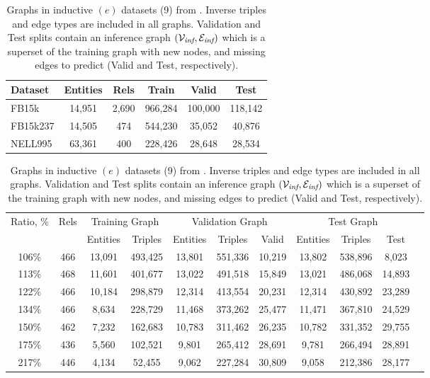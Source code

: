 \begin{table}[!ht]
\centering
\caption{Graph in transductive datasets (3) from \citet{betae}. Inverse triples and edge types are included in the splits. Train, Valid, Test denote triples in the respective set. }
\label{tab:app_datasets_transd}
\begin{tabular}{lccccc}\toprule
Dataset &Entities &Rels &Train &Valid &Test  \\\midrule
FB15k & 14,951 & 2,690 & 966,284 & 100,000 & 118,142 \\
FB15k237 &14,505 &474 &544,230 &35,052 &40,876 \\
NELL995  &63,361 &400 &228,426 &28,648 & 28,534 \\
\bottomrule
\end{tabular}
%
\caption{Graphs in inductive $(e)$ datasets (9) from \citet{galkin2022}. Inverse triples and edge types are included in all graphs. Validation and Test splits contain an inference graph $({\mathcal{V}}_\textit{inf}, {\mathcal{E}}_\textit{inf})$ which is a superset of the training graph with new nodes, and missing edges to predict (Valid and Test, respectively).  }
\label{tab:app_datasets_inde}
\begin{adjustbox}{width=\textwidth}
\begin{tabular}{ccccccccccc}\toprule
\multirow{2}{*}{Ratio, \%} &\multirow{2}{*}{Rels} &\multicolumn{2}{c}{Training Graph} &\multicolumn{3}{c}{Validation Graph} &\multicolumn{3}{c}{Test Graph} \\ \cmidrule(lr){3-4}  \cmidrule(lr){5-7}  \cmidrule(lr){8-10}
& &Entities & Triples & Entities & Triples & Valid & Entities & Triples & Test \\ \midrule
106\% &466 &13,091 &493,425 &13,801 &551,336 &10,219 &13,802 &538,896 &8,023 \\
113\% &468 &11,601 &401,677 &13,022 &491,518 &15,849 &13,021 &486,068 &14,893 \\
122\% &466 &10,184 &298,879 &12,314 &413,554 &20,231 &12,314 &430,892 &23,289 \\
134\% &466 &8,634 &228,729 &11,468 &373,262 &25,477 &11,471 &367,810 &24,529 \\
150\% &462 &7,232 &162,683 &10,783 &311,462 &26,235 &10,782 &331,352 &29,755 \\
175\% &436  &5,560 &102,521 &9,801 &265,412 &28,691 &9,781 &266,494 &28,891 \\
217\% &446  &4,134 &52,455 &9,062 &227,284 &30,809 &9,058 &212,386 &28,177 \\

\end{tabular}
\end{adjustbox}
\end{table}
